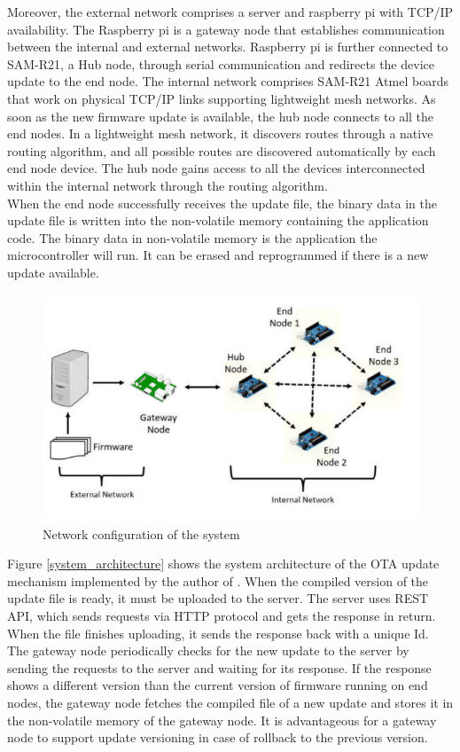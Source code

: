 \documentclass[12pt,a4paper]{article}
\begin{document}
{Moreover, the external network comprises a server and raspberry pi with TCP/IP availability. The Raspberry pi is a gateway node that establishes communication between the internal and external networks. Raspberry pi is further connected to SAM-R21, a Hub node, through serial communication and redirects the device update to the end node. The internal network comprises SAM-R21 Atmel boards that work on physical TCP/IP links supporting lightweight mesh networks. As soon as the new firmware update is available, the hub node connects to all the end nodes. In a lightweight mesh network, it discovers routes through a native routing algorithm, and all possible routes are discovered automatically by each end node device. The hub node gains access to all the devices interconnected within the internal network through the routing algorithm. \cite{r30} \\

When the end node successfully receives the update file, the binary data in the update file is written into the non-volatile memory containing the application code. The binary data in non-volatile memory is the application the microcontroller will run. It can be erased and reprogrammed if there is a new update available. \cite{r30} \\

\begin{figure}[H]
\centering
\includegraphics[scale=1]{sub_urban_architecture.PNG}
\caption{Network configuration of the system \cite{r30}}
\label{sub_urban_architecture}
\end{figure}

Figure \ref{system_architecture} shows the system architecture of the OTA update mechanism implemented by the author of \cite{r30}. When the compiled version of the update file is ready, it must be uploaded to the server. The server uses REST API, which sends requests via HTTP protocol and gets the response in return. When the file finishes uploading, it sends the response back with a unique Id. The gateway node periodically checks for the new update to the server by sending the requests to the server and waiting for its response. If the response shows a different version than the current version of firmware running on end nodes, the gateway node fetches the compiled file of a new update and stores it in the non-volatile memory of the gateway node. It is advantageous for a gateway node to support update versioning in case of rollback to the previous version. \cite{r30} \\

}
\end{document}
